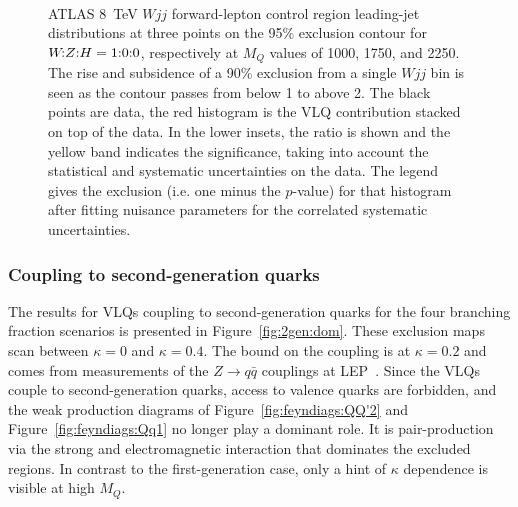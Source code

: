 \begin{figure}[th]
  \centering
  \hspace*{-3.5em}%
  \mbox{%
    \quad
    \quad
    }
    \caption{ATLAS \SI{8}{\TeV} $Wjj$ forward-lepton control region leading-jet
      \pT distributions at three points on the 95\% exclusion contour for
      $\text{$W\!$:$Z$:$H$}=\text{1:0:0}$, respectively at $M_Q$ values of
      \protect{} \unit{1000}{\GeV},
      \protect{} \unit{1750}{\GeV}, and
      \protect{} \unit{2250}{\GeV}. The rise and
      subsidence of a 90\% \CLs exclusion from a single $Wjj$ bin is seen as the
      contour passes from below \unit{1}{\TeV} to above \unit{2}{\TeV}.
      The black points are data, the red histogram is the VLQ contribution stacked on top of the data.
      In the lower insets, the ratio is shown and the yellow band indicates the significance, taking into
      account the statistical and systematic uncertainties on the data. The legend gives the exclusion
      (i.e. one minus the $p$-value)  for that histogram after fitting nuisance parameters for the correlated
      systematic uncertainties.
}
  \label{fig:gen1:wjjscan}
\end{figure}

\subsubsection{Coupling to second-generation quarks}
The results for VLQs coupling to second-generation quarks for the four branching fraction scenarios is presented in Figure~\ref{fig:2gen:dom}. These exclusion maps scan between $\kappa=0$ and $\kappa=0.4$. The bound on the coupling is at $\kappa=0.2$ and comes from measurements of the $Z \rightarrow q\bar{q}$ couplings at LEP~\cite{Buchkremer:2013bha,ALEPH:2005ab}. Since the VLQs couple to second-generation quarks, access to valence quarks are forbidden, and the weak production diagrams of Figure~\ref{fig:feyndiags:QQ'2} and Figure~\ref{fig:feyndiags:Qq1} no longer play a dominant role. It is pair-production via the strong and electromagnetic interaction that dominates the excluded regions. In contrast to the first-generation case, only a hint of $\kappa$ dependence is visible at high $M_Q$. 

